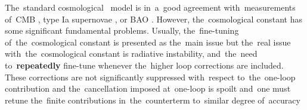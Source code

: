 
\label{ssec:lambda}
The~standard cosmological \LCDM\ model is in~a~good agreement with~measurements of~CMB \parencite{planck_cosm}, type Ia supernovae \parencite{Abbott_2019}, or BAO \parencite{BAO_results}. However, the~cosmological constant has some significant fundamental problems. Usually, the~fine-tuning of~the~cosmological constant is presented as the~main issue but the~real issue with~the~cosmological constant is radiative instability, and~the~need to~\textbf{repeatedly} fine-tune whenever the~higher loop corrections are included. These corrections are not significantly suppressed with~respect to~the~one-loop contribution \parencite{2015arXiv150205296P,2012CRPhy..13..566M} and the~cancellation imposed at~one-loop is spoilt and~one must retune the~finite contributions in~the~counterterm to~similar degree of~accuracy

